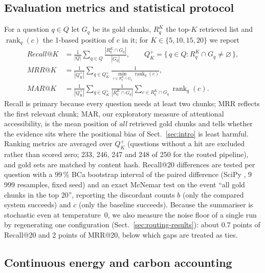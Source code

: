 \documentclass[pdflatex,sn-mathphys-num]{sn-jnl}
\makeatletter
\newcommand{\Rec}[1]{Recall@#1}
\newcommand{\MRR}[1]{MRR@#1}
\newcommand{\MAR}[1]{MAR@#1}
\newcommand{\rnk}{\operatorname{rank}}
\theoremstyle{thmstyleone}%
\theoremstyle{thmstylethree}%
\makeatother
\begin{document}
\subsection{Evaluation metrics and statistical protocol}\label{sec:metrics}

For a question $q\in Q$ let $G_q$ be its gold chunks, $R_q^K$ the top-$K$ retrieved list and $\rnk_q(c)$ the 1-based position of $c$ in it; for $K\in\{5,10,15,20\}$ we report
\begin{align}
\Rec{K}&=\frac{1}{|Q|}\sum_{q\in Q}\frac{|R_q^K\cap G_q|}{|G_q|},\qquad
Q_K^{+}=\{\,q\in Q : R_q^K\cap G_q\neq\varnothing\,\},\\
\MRR{K}&=\frac{1}{|Q_K^{+}|}\sum_{q\in Q_K^{+}}\frac{1}{\min_{c\in R_q^K\cap G_q}\rnk_q(c)},\\
\MAR{K}&=\frac{1}{|Q_K^{+}|}\sum_{q\in Q_K^{+}}\frac{1}{|R_q^K\cap G_q|}\sum_{c\in R_q^K\cap G_q}\rnk_q(c).
\end{align}
Recall is primary because every question needs at least two chunks; MRR \cite{voorhees1999trec8} reflects the first relevant chunk; MAR, our exploratory measure of attentional accessibility, is the mean position of \emph{all} retrieved gold chunks and tells whether the evidence sits where the positional bias of Sect.~\ref{sec:intro} is least harmful. Ranking metrics are averaged over $Q_K^{+}$ (questions without a hit are excluded rather than scored zero; 233, 246, 247 and 248 of 250 for the routed pipeline), and gold sets are matched by content hash. \Rec{20} differences are tested per question with a 99\,\% BCa bootstrap interval of the paired difference \cite{efron1987better,smucker2007comparison} (SciPy \cite{virtanen2020scipy}, 9\,999 resamples, fixed seed) and an exact McNemar test \cite{McNemar_1947,dietterich1998approximate} on the event ``all gold chunks in the top 20'', reporting the discordant counts $b$ (only the compared system succeeds) and $c$ (only the baseline succeeds). Because the summariser is stochastic even at temperature~0, we also measure the noise floor of a single run by regenerating one configuration (Sect.~\ref{sec:routing-results}): about 0.7 points of \Rec{20} and 2 points of \MRR{20}, below which gaps are treated as ties.

\subsection{Continuous energy and carbon accounting}\label{sec:energy}
\end{document}
